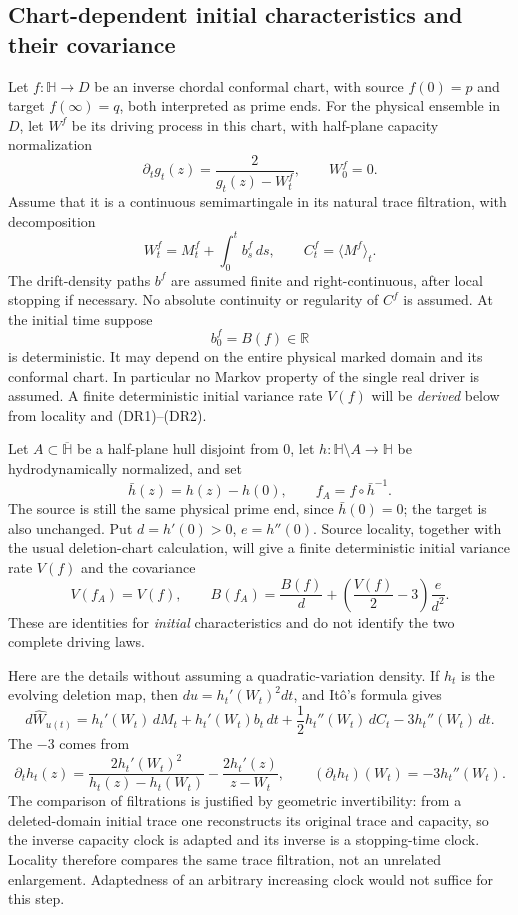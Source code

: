 \documentclass[11pt]{article}
\theoremstyle{definition}\newtheorem{definition}[theorem]{Definition}
\theoremstyle{remark}\newtheorem{remark}[theorem]{Remark}
\begin{document}
\subsection{Chart-dependent initial characteristics and their covariance}

Let $f:\mathbb H\to D$ be an inverse chordal conformal chart, with source
$f(0)=p$ and target $f(\infty)=q$, both interpreted as prime ends.
For the physical ensemble in $D$, let $W^f$ be its driving process in this
chart, with half-plane capacity normalization
\[
 \partial_t g_t(z)=\frac{2}{g_t(z)-W^f_t},\qquad W^f_0=0.
\]
Assume that it is a continuous semimartingale in its natural trace filtration,
with decomposition
\[
 W^f_t=M^f_t+\int_0^t b^f_s\,ds,\qquad
 C^f_t=\langle M^f\rangle_t.
 \tag{DR1}
\]
The drift-density paths $b^f$ are assumed finite and right-continuous,
after local stopping if necessary.  No absolute continuity or regularity
of $C^f$ is assumed.  At the initial time suppose
\[
 b^f_0=B(f)\in\mathbb R
 \tag{DR2}
\]
is deterministic.  It may depend on the entire physical marked domain and
its conformal chart.  In particular no Markov property of the single real
driver is assumed.  A finite deterministic initial variance rate $V(f)$
will be \emph{derived} below from locality and (DR1)--(DR2).

Let $A\subset\overline{\mathbb H}$ be a half-plane hull disjoint from $0$,
let $h:\mathbb H\setminus A\to\mathbb H$ be hydrodynamically normalized,
and set
\[
 \bar h(z)=h(z)-h(0),\qquad f_A=f\circ\bar h^{-1}.
 \tag{DR3}
\]
The source is still the same physical prime end, since $\bar h(0)=0$;
the target is also unchanged.  Put $d=h'(0)>0$, $e=h''(0)$.
Source locality, together with the usual deletion-chart calculation, will
give a finite deterministic initial variance rate $V(f)$ and the covariance
\[
 \boxed{\quad V(f_A)=V(f),\qquad
 B(f_A)=\frac{B(f)}{d}
       +\left(\frac{V(f)}2-3\right)\frac{e}{d^2}.\quad}
 \tag{DR4}
\]
These are identities for \emph{initial} characteristics and do not identify
the two complete driving laws.

Here are the details without assuming a quadratic-variation density.
If $h_t$ is the evolving deletion map, then $du=h_t'(W_t)^2dt$, and
It\^o's formula gives
\[
 d\widehat W_{u(t)}
  =h_t'(W_t)\,dM_t+h_t'(W_t)b_t\,dt
       +\frac12 h_t''(W_t)\,dC_t-3h_t''(W_t)\,dt.
 \tag{DR5}
\]
The $-3$ comes from
\[
 \partial_t h_t(z)
 =\frac{2h_t'(W_t)^2}{h_t(z)-h_t(W_t)}
       -\frac{2h_t'(z)}{z-W_t},\qquad
 (\partial_t h_t)(W_t)=-3h_t''(W_t).
\]
The comparison of filtrations is justified by geometric invertibility:
from a deleted-domain initial trace one reconstructs its original trace and
capacity, so the inverse capacity clock is adapted and its inverse is a
stopping-time clock.  Locality therefore compares the same trace filtration,
not an unrelated enlargement.  Adaptedness of an arbitrary increasing clock
would not suffice for this step.
\end{document}
